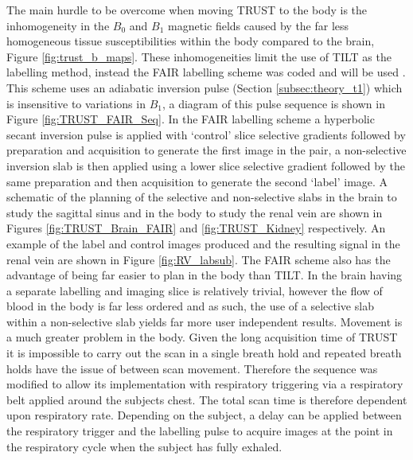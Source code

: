 The main hurdle to be overcome when moving \ac{TRUST} to the body is the inhomogeneity in the $B_0$ and $B_1$ magnetic fields caused by the far less homogeneous tissue susceptibilities within the body compared to the brain, Figure \ref{fig:trust_b_maps}. These inhomogeneities limit the use of \ac{TILT} as the labelling method, instead the \ac{FAIR} labelling scheme was coded and will be used \cite{martirosian_fair_2004}. This scheme uses an adiabatic inversion pulse (Section \ref{subsec:theory_t1}) which is insensitive to variations in $B_1$, a diagram of this pulse sequence is shown in Figure \ref{fig:TRUST_FAIR_Seq}. In the \ac{FAIR} labelling scheme a hyperbolic secant inversion pulse is applied with `control' slice selective gradients  followed by \ttwo preparation and acquisition to generate the first image in the pair, a non-selective inversion slab is then applied using a lower slice selective gradient followed by the same \ttwo preparation and then acquisition to generate the second `label' image. A schematic of the planning of the selective and non-selective slabs in the brain to study the sagittal sinus and in the body to study the renal vein are shown in Figures \ref{fig:TRUST_Brain_FAIR} and \ref{fig:TRUST_Kidney} respectively. An example of the label and control images produced and the resulting signal in the renal vein are shown in Figure \ref{fig:RV_labsub}. The \ac{FAIR} scheme also has the advantage of being far easier to plan in the body than \ac{TILT}. In the brain having a separate labelling and imaging slice is relatively trivial, however the flow of blood in the body is far less ordered and as such, the use of a selective slab within a non-selective slab yields far more user independent results. Movement is a much greater problem in the body. Given the long acquisition time of \ac{TRUST} it is impossible to carry out the scan in a single breath hold and repeated breath holds have the issue of between scan movement. Therefore the sequence was modified to allow its implementation with respiratory triggering via a respiratory belt applied around the subjects chest. The total scan time is therefore dependent upon respiratory rate. Depending on the subject, a delay can be applied between the respiratory trigger and the labelling pulse to acquire images at the point in the respiratory cycle when the subject has fully exhaled.

